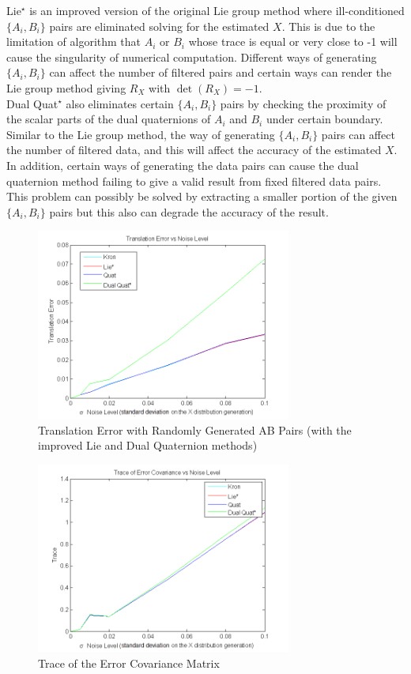 \documentclass[twocolumn,10pt]{asme2ej}
\begin{document}
{\color{blue} Lie$^{\star}$ is an improved version of the original Lie group method where ill-conditioned $\{A_{i},B_{i}\}$ pairs are eliminated solving for the estimated $X$. This is due to the limitation of algorithm that $A_{i}$ or $B_{i}$ whose trace is equal or very close to -1 will cause the singularity of numerical computation. Different ways of generating $\{A_{i},B_{i}\}$ can affect the number of filtered pairs and certain ways can render the Lie group method giving $R_{X}$ with $\det(R_{X}) = -1$.\\

Dual Quat$^{\star}$ also eliminates certain $\{A_{i},B_{i}\}$ pairs by checking the proximity of the scalar parts of the dual quaternions of $A_{i}$ and $B_{i}$ under certain boundary. Similar to the Lie group method, the way of generating $\{A_{i},B_{i}\}$ pairs can affect the number of filtered data, and this will affect the accuracy of the estimated $X$. In addition, certain ways of generating the data pairs can cause the dual quaternion method failing to give a valid result from fixed filtered data pairs. This problem can possibly be solved by extracting a smaller portion of the given $\{A_{i},B_{i}\}$ pairs but this also can degrade the accuracy of the result.  
\begin{figure}[h]
\includegraphics[width=3.3in]{figure/tranErrorRand}
\centering
\caption{Translation Error with Randomly Generated AB Pairs (with the improved Lie and Dual Quaternion methods)}
\label{transerror}
\end{figure}

\begin{figure}[h]
\includegraphics[width=3.3in]{figure/traceCovRand}
\centering
\caption{Trace of the Error Covariance Matrix}
\label{traceerror}
\end{figure}

}
\end{document}
